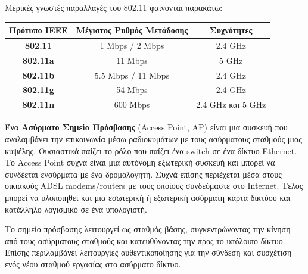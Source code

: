 Μερικές γνωστές παραλλαγές του 802.11 φαίνονται παρακάτω:

\begin{center}
\begin{tabular}{|c|c|c|}
  \hline
    \textbf{Πρότυπο ΙΕΕΕ}&\textbf{Μέγιστος Ρυθμός Μετάδοσης}&\textbf{Συχνότητες}\\
  \hline
  \textbf{802.11} & 1 Mbps / 2 Mbps & 2.4 GHz \\
  \hline
  \textbf{802.11a} & 11 Mbps & 5 GHz \\
  \hline
  \textbf{802.11b} & 5.5 Mbps / 11 Mbps & 2.4 GHz \\
  \hline
  \textbf{802.11g} & 54 Mbps & 2.4 GHz \\
  \hline
  \textbf{802.11n} & 600 Mbps & 2.4 GHz και 5 GHz \\
  \hline
\end{tabular}
\end{center}

\begin{inthebox}
Ένα \textbf{Ασύρματο Σημείο Πρόσβασης} (Access Point, AP) είναι μια συσκευή που αναλαμβάνει την επικοινωνία μέσω ραδιοκυμάτων με τους ασύρματους σταθμούς μιας κυψέλης. Ουσιαστικά παίζει το ρόλο που παίζει ένα switch σε ένα δίκτυο Ethernet. Το Access Point συχνά είναι μια αυτόνομη εξωτερική συσκευή και μπορεί να συνδέεται ενσύρματα με ένα δρομολογητή.  Συχνά επίσης περιέχεται μέσα στους οικιακούς ADSL modems/routers με τους οποίους συνδεόμαστε στο Internet. Τέλος μπορεί να υλοποιηθεί και μια εσωτερική ή εξωτερική ασύρματη κάρτα δικτύου και κατάλληλο λογισμικό σε ένα υπολογιστή.\\
\end{inthebox} 

Το σημείο πρόσβασης λειτουργεί ως σταθμός βάσης, συγκεντρώνοντας την κίνηση από τους ασύρματους σταθμούς και κατευθύνοντας την προς το υπόλοιπο δίκτυο. Επίσης περιλαμβάνει λειτουργίες αυθεντικοποίησης για την σύνδεση και συσχέτιση ενός νέου σταθμού εργασίας στο ασύρματο δίκτυο.
